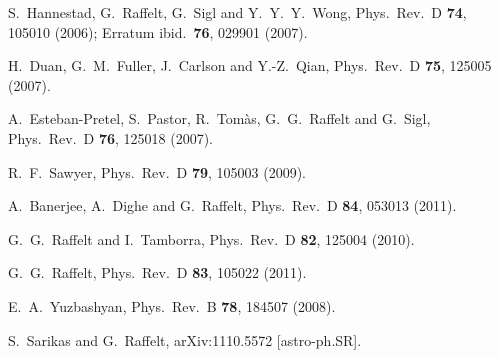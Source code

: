 \documentclass[twocolumn,prd,showpacs,
floatfix,preprintnumbers,nofootinbib]{revtex4}
\begin{document}
\begin{thebibliography}{00}
  S.~Hannestad, G.~Raffelt, G.~Sigl and Y.~Y.~Y.~Wong,
  Phys.\ Rev.\ D {\bf 74}, 105010 (2006);
  Erratum ibid.\ {\bf 76}, 029901 (2007).

  H.~Duan, G.~M.~Fuller, J.~Carlson and Y.-Z.~Qian,
  Phys.\ Rev.\ D {\bf 75}, 125005 (2007).

  A.~Esteban-Pretel, S.~Pastor, R.~Tom\`as, G.~G.~Raffelt and G.~Sigl,
  Phys.\ Rev.\ D {\bf 76}, 125018 (2007).

  R.~F.~Sawyer,
  Phys.\ Rev.\  D {\bf 79}, 105003 (2009).

  A.~Banerjee, A.~Dighe and G.~Raffelt,
  Phys.\ Rev.\ D {\bf 84}, 053013 (2011).

  G.~G.~Raffelt and I.~Tamborra,
  Phys.\ Rev.\ D {\bf 82}, 125004 (2010).

  G.~G.~Raffelt,
  Phys.\ Rev.\ D {\bf 83}, 105022 (2011).

  E.~A.~Yuzbashyan,
  Phys.\ Rev.\ B {\bf 78}, 184507 (2008).
  
  S.~Sarikas and G.~Raffelt,
  arXiv:1110.5572 [astro-ph.SR].

\end{thebibliography}
\end{document}
